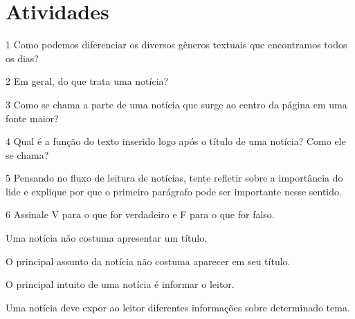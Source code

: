 \pagebreak
\section*{Atividades}

\num{1} Como podemos diferenciar os diversos gêneros textuais que
encontramos todos os dias?



\num{2} Em geral, do que trata uma notícia?


\num{3} Como se chama a parte de uma notícia que surge ao centro da página
em uma fonte maior?


\num{4} Qual é a função do texto inserido logo após o título de uma notícia? Como ele se chama?


\num{5} Pensando no fluxo de leitura de notícias, tente refletir sobre a importância do lide e explique por que o primeiro parágrafo pode ser importante nesse sentido.


\num{6} Assinale V para o que for verdadeiro e F para o que for falso.

\begin{boxlist}
 Uma notícia não costuma apresentar um título.

 O principal assunto da notícia não costuma aparecer em seu título.

 O principal intuito de uma notícia é informar o leitor.

 Uma notícia deve expor ao leitor diferentes informações sobre
determinado tema.
\end{boxlist}\pagebreak

